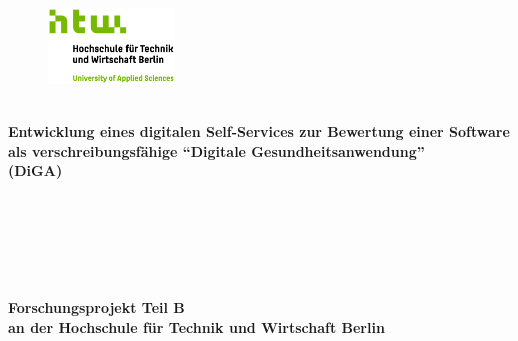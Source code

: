  \thispagestyle{empty}
\begin{titlepage}
	 \thispagestyle{empty}
\begin{center}
	 \thispagestyle{empty}
\begin{figure}[t]
	\centering
	\includegraphics[width=0.3\textwidth]{assets/HTW_Logo.jpg}
	
\end{figure}

$~~$\\
\textbf{\huge Entwicklung eines digitalen Self-Services zur Bewertung einer Software als verschreibungsfähige ``Digitale Gesundheitsanwendung''\\(DiGA) }\paragraph{}$~~$\\
\paragraph{}$~~$\\
\paragraph{}$~~$\\
\textbf{Forschungsprojekt Teil B}\\ \textbf{an der Hochschule für Technik und Wirtschaft Berlin}
\paragraph{}$~~$\\

\end{center}
\end{titlepage}
